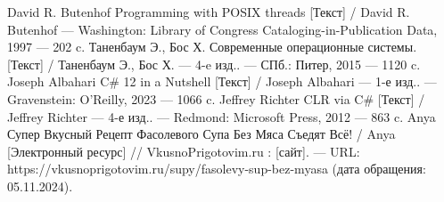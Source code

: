 \begin{thebibliography}{}
	 David R. Butenhof Programming with POSIX threads [Текст] / David R. Butenhof — Washington: Library of Congress Cataloging-in-Publication Data, 1997 — 202 c.
	 Таненбаум Э., Бос Х. Современные операционные системы. [Текст] / Таненбаум Э., Бос Х. — 4-e изд.. — СПб.: Питер, 2015 — 1120 c.
         Joseph Albahari C\# 12 in a Nutshell [Текст] / Joseph Albahari — 1-е изд.. — Gravenstein:  O’Reilly, 2023 — 1066 c.
         Jeffrey Richter CLR via C\# [Текст] / Jeffrey Richter — 4-е изд.. — Redmond: Microsoft Press, 2012 —  863 c.
         Anya Супер Вкусный Рецепт Фасолевого Супа Без Мяса Съедят Всё! / Anya [Электронный ресурс] // VkusnoPrigotovim.ru : [сайт]. — URL: https://vkusnoprigotovim.ru/supy/fasolevy-sup-bez-myasa (дата обращения: 05.11.2024).
\end{thebibliography}